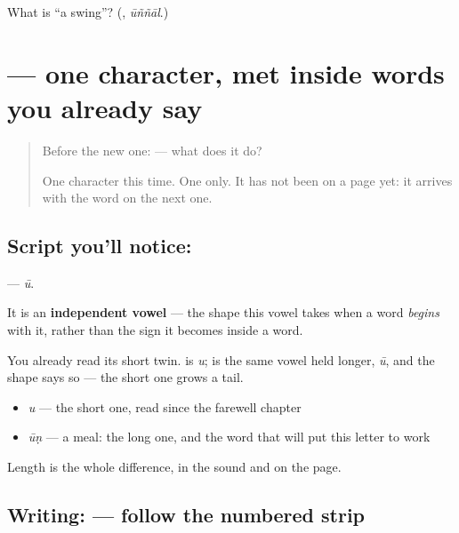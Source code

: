 \begin{tcolorbox}[breakable,colback=teal!4,colframe=teal!35!black,title={Before you move on}]
What is \textquotedblleft{}a swing\textquotedblright{}? (\textbf{}, \emph{ūññāl}.)
\end{tcolorbox}
\section[\texorpdfstring{\ml{ഊ} (ū)}{ഊ (ū)}]{ — one character, met inside words you already say}

\label{lesson:ML-S125-letter-uu}



\begin{quote}
Before the new one:  — what does it do?

One character this time. One only. It has not been on a page yet: it arrives with the word on the next one.
\end{quote}

\subsection*{Script you'll notice: }
\textbf{} — \emph{ū}.

It is an \textbf{independent vowel} — the shape this vowel takes when a word \emph{begins} with it, rather than the sign it becomes inside a word.

You already read its short twin. \textbf{} is \emph{u}; \textbf{} is the same vowel held longer, \emph{ū}, and the shape says so — the short one grows a tail.

\begin{itemize}
\raggedright
  \item \textbf{} \emph{u} — the short one, read since the farewell chapter
  \item \textbf{} \emph{ūṇ} — a meal: the long one, and the word that will put this letter to work
\end{itemize}

Length is the whole difference, in the sound and on the page.

\subsection*{Writing:  — follow the numbered strip}


